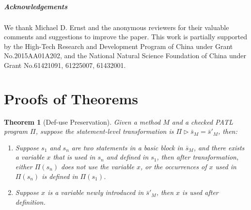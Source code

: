 \documentclass[a4paper, USenglish]{lipics-v2016}
\newcommand{\PATL}{PATL\xspace}
\theoremstyle{plain}
\begin{document}
\subparagraph*{Acknowledgements}

We thank Michael D. Ernst and the anonymous reviewers for their valuable comments and suggestions to improve the paper. This work is partially supported by the High-Tech Research and Development Program of China under Grant No.2015AA01A202, and the National Natural Science Foundation of China under Grant No.61421091, 61225007, 61432001.



%
{}



\newpage
\appendix

\newtheorem*{thm}{Theorem}
\newtheorem*{prop}{Property}

\section{Proofs of Theorems}

\begin{thm}[Def-use Preservation] Given a method $M$ and a checked \PATL program $\Pi$, suppose the statement-level transformation is $\Pi\triangleright \bar{s}_M=\bar{s}'_{M}$, then:
  \begin{enumerate}
    \item Suppose $s_1$ and $s_n$ are two statements in a basic block in $\bar{s}_M$, and there exists a variable $x$ that is used in $s_n$ and defined in $s_1$, then after transformation, either $\Pi(s_n)$ does not use the variable $x$, or the occurrences of $x$ used in $\Pi(s_n)$ is defined in $\Pi(s_1)$. 
    \item Suppose $x$ is a variable newly introduced in $\bar{s}'_M$, then $x$ is used after definition.
  \end{enumerate}
\end{thm}
\end{document}
